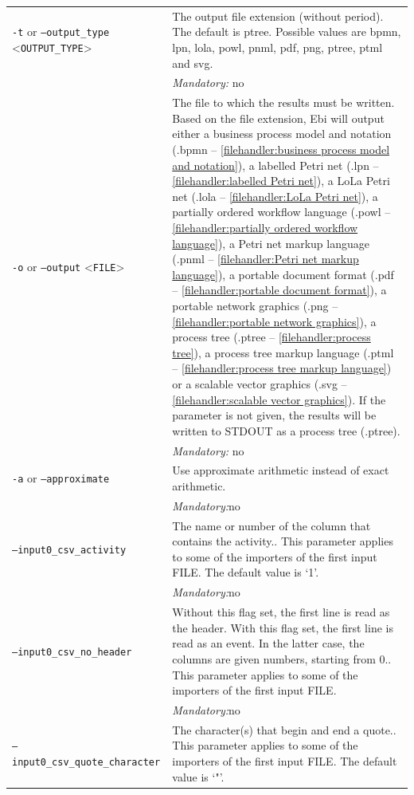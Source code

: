{\begin{tabularx}{\linewidth}{lX}
\texttt{-t} or \texttt{--output\_type} <\texttt{OUTPUT\_TYPE}> &
The output file extension (without period). The default is ptree. Possible values are bpmn, lpn, lola, powl, pnml, pdf, png, ptree, ptml and svg.\\
&\textit{Mandatory:} \quad no\\
\texttt{-o} or \texttt{--output} <\texttt{FILE}> &
The file to which the results must be written. Based on the file extension, Ebi will output either a business process model and notation (.bpmn -- \cref{filehandler:business process model and notation}), a labelled Petri net (.lpn -- \cref{filehandler:labelled Petri net}), a LoLa Petri net (.lola -- \cref{filehandler:LoLa Petri net}), a partially ordered workflow language (.powl -- \cref{filehandler:partially ordered workflow language}), a Petri net markup language (.pnml -- \cref{filehandler:Petri net markup language}), a portable document format (.pdf -- \cref{filehandler:portable document format}), a portable network graphics (.png -- \cref{filehandler:portable network graphics}), a process tree (.ptree -- \cref{filehandler:process tree}), a process tree markup language (.ptml -- \cref{filehandler:process tree markup language}) or a scalable vector graphics (.svg -- \cref{filehandler:scalable vector graphics}).
If the parameter is not given, the results will be written to STDOUT as a process tree (.ptree).\\
&\textit{Mandatory:} \quad no\\
\texttt{-a} or \texttt{--approximate} & Use approximate arithmetic instead of exact arithmetic.\\
&\textit{Mandatory:}\quad no\\
\texttt{--input0\_csv\_activity} & The name or number of the column that contains the activity.. This parameter applies to some of the importers of the first input FILE. The default value is `1'.\\
&\textit{Mandatory:}\quad no\\
\texttt{--input0\_csv\_no\_header} & Without this flag set, the first line is read as the header. 
    With this flag set, the first line is read as an event. In the latter case, the columns are given numbers, starting from 0.. This parameter applies to some of the importers of the first input FILE. \\
&\textit{Mandatory:}\quad no\\
\texttt{--input0\_csv\_quote\_character} & The character(s) that begin and end a quote.. This parameter applies to some of the importers of the first input FILE. The default value is `"'.\\

\end{tabularx}}
